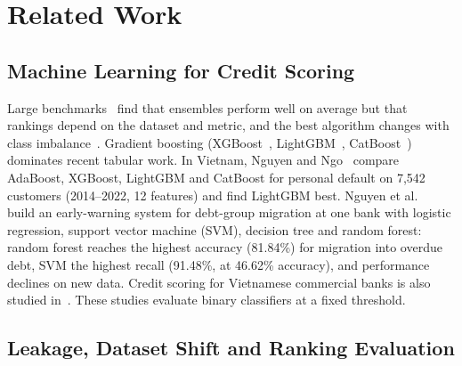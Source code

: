 \documentclass[runningheads]{llncs}
\begin{document}
\section{Related Work}
\label{sec:related}

\subsection{Machine Learning for Credit Scoring}

Large benchmarks~\cite{baesens2003benchmarking,lessmann2015benchmarking} find that ensembles perform well on average but that rankings depend on the dataset and metric, and the best algorithm changes with class imbalance~\cite{brown2012experimental}. Gradient boosting (XGBoost~\cite{chen2016xgboost}, LightGBM~\cite{ke2017lightgbm}, CatBoost~\cite{prokhorenkova2018catboost}) dominates recent tabular work. In Vietnam, Nguyen and Ngo~\cite{nguyen2025boosting} compare AdaBoost, XGBoost, LightGBM and CatBoost for personal default on 7,542 customers (2014--2022, 12 features) and find LightGBM best. Nguyen et al.~\cite{nguyen2024ews} build an early-warning system for debt-group migration at one bank with logistic regression, support vector machine (SVM), decision tree and random forest: random forest reaches the highest accuracy (81.84\%) for migration into overdue debt, SVM the highest recall (91.48\%, at 46.62\% accuracy), and performance declines on new data. Credit scoring for Vietnamese commercial banks is also studied in~\cite{tran2021mlcredit,trung2024credit}. These studies evaluate binary classifiers at a fixed threshold.

\subsection{Leakage, Dataset Shift and Ranking Evaluation}
\end{document}
